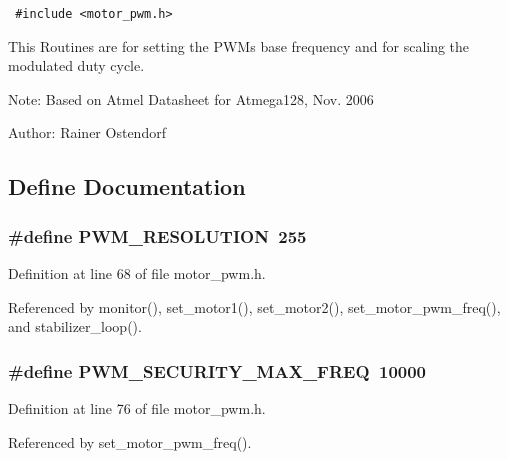 \begin{Code}\begin{verbatim} #include <motor_pwm.h> 
\end{verbatim}\end{Code}



This Routines are for setting the PWMs base frequency and for scaling the modulated duty cycle.

\begin{Desc}
\item[Note:]Based on Atmel Datasheet for Atmega128, Nov. 2006 \end{Desc}
\begin{Desc}
\item[Author:]Rainer Ostendorf \end{Desc}


\subsection{Define Documentation}
\subsubsection{\setlength{\rightskip}{0pt plus 5cm}\#define PWM\_\-RESOLUTION~255}\label{group__ro__motor__pwm_gd53655e6cac4dfd2c67ecda5eea77a4e}




Definition at line 68 of file motor\_\-pwm.h.

Referenced by monitor(), set\_\-motor1(), set\_\-motor2(), set\_\-motor\_\-pwm\_\-freq(), and stabilizer\_\-loop().
\subsubsection{\setlength{\rightskip}{0pt plus 5cm}\#define PWM\_\-SECURITY\_\-MAX\_\-FREQ~10000}\label{group__ro__motor__pwm_g5cdf3a3df2eac2fbed2c0541b6f01b17}




Definition at line 76 of file motor\_\-pwm.h.

Referenced by set\_\-motor\_\-pwm\_\-freq().

